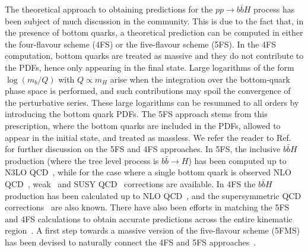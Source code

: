 \documentclass[main.tex]{subfiles}
\begin{document}
The theoretical approach to obtaining predictions for the $pp\to b\bar{b}H$ process has been subject
of much discussion in the community. This is due to the fact that, in the presence of bottom quarks,
a theoretical prediction can be computed in either the four-flavour scheme (4FS) or the five-flavour
scheme (5FS). In the 4FS computation, bottom quarks are treated as massive and they do not
contribute to the PDFs, hence only appearing in the final state.
Large logarithms of the form $\log(m_b/Q)$ with $Q \propto m_H$ arise when the integration over the
bottom-quark phase space is performed, and such contributions may spoil the convergence of the
perturbative series. These large logarithms can be resummed to all orders by introducing the
bottom quark PDFs.  The 5FS approach stems from this prescription, where
the bottom quarks are included in the PDFs, allowed to appear in the
initial state, and treated as massless.  We refer the reader to Ref.~\cite{Maltoni:2012pa} for further
discussion on the 5FS and 4FS approaches. 
In 5FS, the inclusive $b\bar{b}H$ production (where the tree level process is $b\bar{b}\to H$) has been computed up to
N3LO QCD~\cite{Dicus:1998hs,Balazs:1998sb,Maltoni:2003pn,Harlander:2010cz,Buehler:2012cu,Harlander:2012pb,H:2019nsw,Duhr:2019kwi,Mondini:2021nck}, 
while for the case where a single bottom quark is observed NLO QCD~\cite{Campbell:2002zm}, weak~\cite{Dawson:2010yz} 
and SUSY QCD~\cite{Dawson:2011pe} corrections are available.
In 4FS the $b\bar{b}H$ production has been calculated up to 
NLO QCD~\cite{Dittmaier:2003ej,Dawson:2003kb,Dawson:2004sh,Wiesemann:2014ioa,Jager:2015hka,Deutschmann:2018avk},
and the supersymmetric QCD corrections~\cite{Liu:2012qu,Dittmaier:2014sva} are also known.  
There have also been efforts in matching the 5FS and 4FS calculations to obtain accurate predictions across the entire kinematic region~\cite{Harlander:2011aa,Bonvini:2015pxa,Forte:2015hba,Forte:2016sja,Duhr:2020kzd}. 
A first step towards a massive version of the five-flavour scheme (5FMS) has been devised to naturally connect the 4FS and 5FS approaches~\cite{Krauss:2017wmx,Figueroa:2018chn}.
\end{document}
